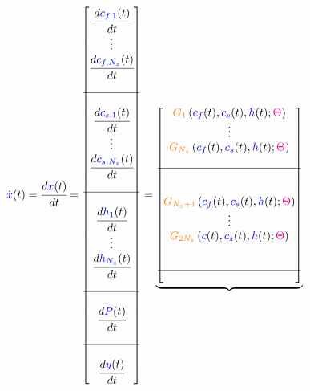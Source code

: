 \documentclass[../Article_Model_Parameters.tex]{subfiles}
\begin{document}
			{\footnotesize
				\begin{align*} \label{discretization}
					\dot{{\color{blue}x}}(t) &= \cfrac{d {\color{blue}x}(t)}{d t} = 
					\begin{bmatrix}
						\cfrac{d {\color{blue}c_{f,1}}(t)}{d t} 	  \\
						\vdots					  \\
						\cfrac{d {\color{blue}c_{f,N_z}}(t)}{d t} \\
						\\ \hline \\
						\cfrac{d {\color{blue}c_{s,1}}(t)}{d t} 	  \\
						\vdots					  \\
						\cfrac{d {\color{blue}c_{s,N_z}}(t)}{d t} \\
						\\ \hline \\
						\cfrac{d {\color{blue}h_1}(t)}{d t} 	  \\
						\vdots 					  \\
						\cfrac{d {\color{blue}h_{N_z}}(t)}{d t} \\
						\\ \hline \\
						\cfrac{d {\color{blue}P}(t)}{d t} \\
						\\ \hline \\
						\cfrac{d {\color{blue}y}(t)}{d t}
					\end{bmatrix}
					=
					\underbrace{\begin{bmatrix}
							{\color{orange}G_1} \left( {\color{blue}c_f}(t),{\color{blue}c_s}(t),{\color{blue}h}(t); {\color{magenta}\Theta} \right)\\ 
							\vdots\\ 
							{\color{orange}G_{N_z}} \left( {\color{blue}c_f}(t),{\color{blue}c_s}(t),{\color{blue}h}(t); {\color{magenta}\Theta} \right)\\ 
							\\ \hline \\ \\
							{\color{orange}G_{N_z+1}} \left( {\color{blue}c_f}(t),{\color{blue}c_s}(t),{\color{blue}h}(t); {\color{magenta}\Theta} \right)\\ 
							\vdots\\
							{\color{orange}G_{2N_z}} \left( {\color{blue}c}(t),{\color{blue}c_s}(t),{\color{blue}h}(t); {\color{magenta}\Theta} \right)\\ 
							\\ \\ \hline \\ 

\end{bmatrix}}
\end{align*}}
\end{document}
